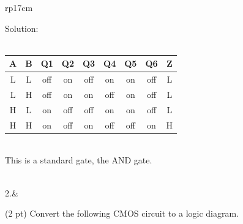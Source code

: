 \documentclass{article}
\begin{document}
\begin{longtable}[l]{rp{17cm}}
\begin{minipage}[t]{\linewidth}
Solution: \\ \\
\begin{tabular}{ccccccccc}
  \textbf{A} & \textbf{B} & \textbf{Q1} & \textbf{Q2} & \textbf{Q3} & \textbf{Q4} & \textbf{Q5} & \textbf{Q6} & \textbf{Z} \\
  \hline
  L & L & off & on & off & on & on & off & L\\
  L & H & off & on & on & off & on & off & L\\
  H & L & on & off & off & on & on & off & L\\
  H & H & on & off & on & off & off & on & H\\
\end{tabular} \\
This is a standard gate, the AND gate.\\
\end{minipage}\\
\medskip
2.&\begin{minipage}[t]{\linewidth}(2 pt) Convert the following CMOS circuit to a logic diagram.\\ \\

\end{minipage}
\end{longtable}
\end{document}
